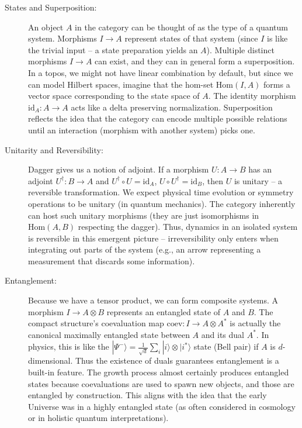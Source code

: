 \documentclass{article}
\begin{document}
\begin{description}
\item[States and Superposition:] An object $A$ in the category can be thought of as the type of a quantum system. Morphisms $I \to A$ represent states of that system (since $I$ is like the trivial input – a state preparation yields an $A$). Multiple distinct morphisms $I \to A$ can exist, and they can in general form a superposition. In a topos, we might not have linear combination by default, but since we can model Hilbert spaces, imagine that the hom-set $\text{Hom}(I,A)$ forms a vector space corresponding to the state space of $A$. The identity morphism $\mathrm{id}_A: A \to A$ acts like a delta preserving normalization. Superposition reflects the idea that the category can encode multiple possible relations until an interaction (morphism with another system) picks one.

\item[Unitarity and Reversibility:] Dagger gives us a notion of adjoint. If a morphism $U: A \to B$ has an adjoint $U^\dagger: B \to A$ and $U^\dagger \circ U = \mathrm{id}_A$, $U \circ U^\dagger = \mathrm{id}_B$, then $U$ is unitary – a reversible transformation. We expect physical time evolution or symmetry operations to be unitary (in quantum mechanics). The category inherently can host such unitary morphisms (they are just isomorphisms in $\text{Hom}(A,B)$ respecting the dagger). Thus, dynamics in an isolated system is reversible in this emergent picture – irreversibility only enters when integrating out parts of the system (e.g., an arrow representing a measurement that discards some information).

\item[Entanglement:] Because we have a tensor product, we can form composite systems. A morphism $I \to A \otimes B$ represents an entangled state of $A$ and $B$. The compact structure’s coevaluation map $\text{coev}: I \to A \otimes A^*$ is actually the canonical maximally entangled state between $A$ and its dual $A^*$. In physics, this is like the $|\Psi^-\rangle = \frac{1}{\sqrt{d}}\sum_i |i\rangle \otimes |i^*\rangle$ state (Bell pair) if $A$ is $d$-dimensional. Thus the existence of duals guarantees entanglement is a built-in feature. The growth process almost certainly produces entangled states because coevaluations are used to spawn new objects, and those are entangled by construction. This aligns with the idea that the early Universe was in a highly entangled state (as often considered in cosmology or in holistic quantum interpretations).


\end{description}
\end{document}
